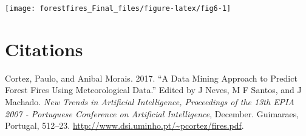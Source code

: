 \documentclass[]{article}
\begin{document}
\begin{center}\texttt{[image: forestfires\_Final\_files/figure-latex/fig6-1]} \end{center}

\section*{Citations}\label{citations}

\hypertarget{refs}{}
\hypertarget{ref-cortezff}{}
Cortez, Paulo, and Anibal Morais. 2017. ``A Data Mining Approach to
Predict Forest Fires Using Meteorological Data.'' Edited by J Neves, M F
Santos, and J Machado. \emph{New Trends in Artificial Intelligence,
Proceedings of the 13th EPIA 2007 - Portuguese Conference on Artificial
Intelligence}, December. Guimaraes, Portugal, 512--23.
\url{http://www.dsi.uminho.pt/~pcortez/fires.pdf}.
\end{document}
